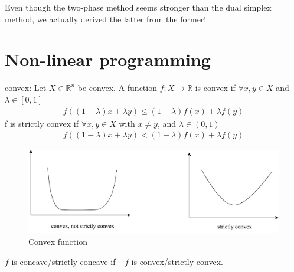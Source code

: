 Even though the two-phase method seems stronger than the dual simplex method, we actually derived the latter from the former!

\section{Non-linear programming}
\begin{definition}
    convex: Let $X\in\mathbb{R}^n$ be convex. A function $f:X\to\mathbb{R}$ is convex if $\forall x, y\in X$ and $\lambda\in[0, 1]$
    \begin{align*}
        f\left( (1-\lambda)x+\lambda y\right)\le (1-\lambda)f(x) + \lambda f(y)
    \end{align*}
    f is strictly convex if $\forall x, y \in X$ with $x\neq y$, and $\lambda\in (0, 1)$
    \begin{align*}
        f\left( (1-\lambda)x+\lambda y\right)< (1-\lambda)f(x) + \lambda f(y)
    \end{align*}
    \begin{figure}[H]
        \centering
        \includegraphics[scale = 0.5]{document/drawio2.pdf}
        \caption{Convex function}
        \label{fig-3}
    \end{figure}
\end{definition}

$f$ is concave/strictly concave if $-f$ is convex/strictly convex.

